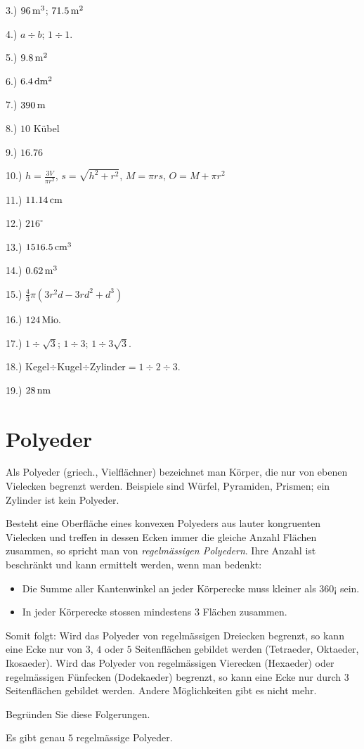 \documentclass[%
11pt,%
twoside,%
titlepage,%
a4page,%
german,%
headsepline%
]{scrartcl}
\begin{document}
3.) $\unit[96]{m^3}$; $\unit[71.5]{m^2}$

4.) $a\div b$; $1\div1$.

5.) $\unit[9.8]{m^2}$

6.) $\unit[6.4]{dm^2}$

7.) $\unit[390]{m}$

8.) $10$ K\"ubel

9.) $16.76$

10.) $h=\frac{3V}{\pi r^2}$, $s=\sqrt{h^2+r^2}$, $M=\pi rs$, $O=M+\pi r^2$

11.) $\unit[11.14]{cm}$

12.) $216^\circ$

13.) $\unit[1516.5]{cm^3}$

14.) $\unit[0.62]{m^3}$

15.) $\frac{4}{3}\pi(3r^2d-3rd^2+d^3)$

16.) $\unit[124]{Mio.}$

17.) $1\div\sqrt{3}$; $1\div 3$; $1\div 3\sqrt{3}$.

18.) Kegel$\div$Kugel$\div$Zylinder$=1\div2\div3$.

19.) $\unit[28]{nm}$

\section{Polyeder}
Als Polyeder (griech., Vielfl\"achner) bezeichnet man K\"orper, die nur von ebenen Vielecken begrenzt werden. Beispiele sind W\"urfel, Pyramiden, Prismen; ein Zylinder ist kein Polyeder.

Besteht eine Oberfl\"ache eines konvexen Polyeders aus lauter kongruenten Vielecken und treffen in dessen Ecken immer die gleiche Anzahl Fl\"achen zusammen, so spricht man von \emph{regelm\"assigen Polyedern}. Ihre Anzahl ist beschr\"ankt und kann ermittelt werden, wenn man bedenkt:
\begin{itemize}
\item Die Summe aller Kantenwinkel an jeder K\"orperecke muss kleiner als $360¡$ sein.
\item In jeder K\"orperecke stossen mindestens $3$ Fl\"achen zusammen.
\end{itemize}
Somit folgt: Wird das Polyeder von regelm\"assigen Dreiecken begrenzt, so kann eine Ecke nur von $3$, $4$ oder $5$ Seitenfl\"achen gebildet werden (Tetraeder, Oktaeder, Ikosaeder). Wird das Polyeder von regelm\"assigen Vierecken (Hexaeder) oder regelm\"assigen F\"unfecken (Dodekaeder) begrenzt, so kann eine Ecke nur durch $3$ Seitenfl\"achen gebildet werden. Andere M\"oglichkeiten gibt es nicht mehr.
\begin{ueb}
Begr\"unden Sie diese Folgerungen.
\end{ueb}
\begin{satz}
Es gibt genau $5$ regelm\"assige Polyeder.
\end{satz}
\end{document}
